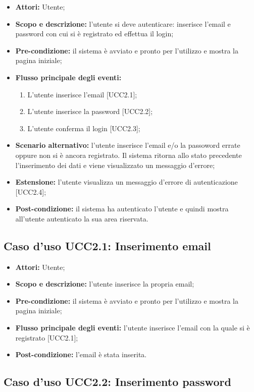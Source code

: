 \begin{itemize}
\item \textbf{Attori:} Utente;
\item \textbf{Scopo e descrizione:} l'utente si deve autenticare: inserisce l'email e password con cui si è registrato ed effettua il login;
\item \textbf{Pre-condizione:} il sistema è avviato e pronto per l'utilizzo e mostra la pagina iniziale;
\item \textbf{Flusso principale degli eventi:}
\begin{enumerate}
\item L'utente inserisce l'email [UCC2.1];
\item L'utente inserisce la password [UCC2.2];
\item L'utente conferma il login [UCC2.3];
\end{enumerate}
\item \textbf{Scenario alternativo:} l'utente inserisce l'email e/o la passoword errate oppure non si è ancora registrato. Il sistema ritorna allo stato precedente l'inserimento dei dati e viene visualizzato un messaggio d'errore;
\item \textbf{Estensione:} l'utente visualizza un messaggio d'errore di autenticazione [UCC2.4];
\item \textbf{Post-condizione:} il sistema ha autenticato l'utente e quindi mostra all'utente autenticato la sua area riservata.
\end{itemize}

\subsection{Caso d'uso UCC2.1: Inserimento email}

\begin{itemize}
\item \textbf{Attori:} Utente;
\item \textbf{Scopo e descrizione:} l'utente inserisce la propria email;
\item \textbf{Pre-condizione:} il sistema è avviato e pronto per l'utilizzo e mostra la pagina iniziale;
\item \textbf{Flusso principale degli eventi:} l'utente inserisce l'email con la quale si è registrato [UCC2.1];
\item \textbf{Post-condizione:} l'email è stata inserita.
\end{itemize}

\subsection{Caso d'uso UCC2.2: Inserimento password}

